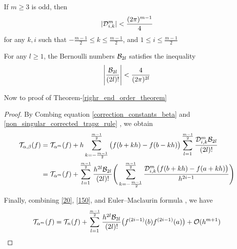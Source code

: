 \documentclass[../document.tex]{subfiles}
\begin{document}
\begin{appendices}
		
		\begin{lemma} \label{A5}
			If $m \geq 3$ is odd, then
			\begin{equation} \label{140}
				| \mathcal{D}_{i,k}^{m} | < \frac{(2\pi)^{m-1}}{4}
			\end{equation}
			for any $k,i$ such that $-\frac{m-1}{2} \leq k \leq \frac{m-1}{2}$, and 
			$1 \leq i \leq \frac{m-1}{2}$
		\end{lemma}	
		
		\begin{lemma}
			For any $l\geq1$, the Bernoulli numbers $\mathcal{B}_{2l}$ satisfies the inequality
			\begin{equation} \label{145}
				\Bigg|
				\frac{\mathcal{B}_{2l}}{(2l)!}
				\Bigg|
				<
				\frac{4}{(2\pi)^{2l}}
			\end{equation} 
		\end{lemma}	
		
		
		Now to proof of Theorem-\eqref{righr_end_order_theorem}
		\begin{proof}
			By Combing equation \eqref{correction_constants_beta} and \eqref{non_singular_corrected_trapz_rule} , we obtain
			\begin{equation}
				\begin{split}
					\Trapz_{\alpha,\beta}(f) &= \Trapz_{\alpha^m}(f) +
					h \sum_{k = -\frac{m-1}{2}}^{\frac{m-1}{2}} 
					\big(
					f(b+kh) - f(b-kh)
					\big)
					\sum_{l=1}^{\frac{m-1}{2}} 
					\frac{ \D_{i,k}^{m} \Bernoulli_{2l}}{(2l)!}
					\\
					&= \Trapz_{\alpha^m}(f) +
					\sum_{l=1}^{\frac{m-1}{2}} \frac{h^{2l}\Bernoulli_{2l}}{(2l)!}
					\Bigg(
					\sum_{k=-\frac{m-1}{2}}^{\frac{m-1}{2}}
					\frac{%
						\D_{i,k}^{m} 
						\big(
						f(b+kh) -f(a+kh)
						\big)
					}
					{%
						h^{2i-1}
					}			 
					\Bigg)
				\end{split}
			\end{equation}
			
			Finally, combining \eqref{20}, \eqref{150}, and Euler–Maclaurin formula
			, we have
			\begin{equation}
				\mathcal{T}_{\alpha^m}(f) =
				\mathcal{T}_n(f) + \sum_{l=1}^{\frac{m-1}{2}} \frac{h^{2l}\mathcal{B}_{2l}}{(2l)!}
				\big(
				f^{(2i-1)}(b)  	f^{(2i-1)}(a)
				\big)
				+ \mathcal{O}(h^{m+1})
			\end{equation}
			
			
			
			
		\end{proof}
		
		
		
		
		
		
		
	\end{appendices}
	
	
	
	
	
	
\end{document}

